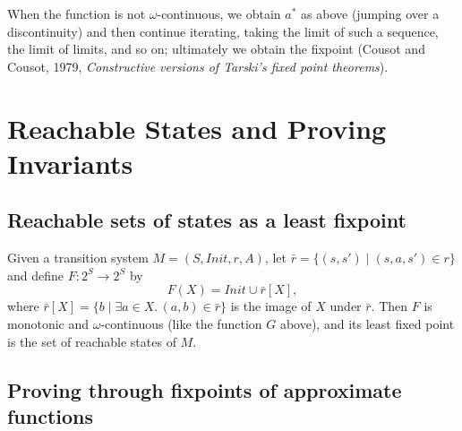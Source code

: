 When the function is not $\omega$-continuous, we obtain $a^*$ as above (jumping over a discontinuity) and then continue iterating, taking the limit of such a sequence, the limit of limits, and so on; ultimately we obtain the fixpoint (Cousot and Cousot, 1979, \emph{Constructive versions of Tarski's fixed point theorems}).
 
 
 
\section{Reachable States and Proving Invariants}
 
\subsection*{Reachable sets of states as a least fixpoint}
 
Given a transition system $M = (S, \mathit{Init}, r, A)$, let $\bar r = \{(s, s') \mid (s, a, s') \in r\}$ and define $F : 2^S \to 2^S$ by
\[
F(X) = \mathit{Init} \cup \bar r[X],
\]
where $\bar r[X] = \{b \mid \exists a \in X.\, (a, b) \in \bar r\}$ is the image of $X$ under $\bar r$. Then $F$ is monotonic and $\omega$-continuous (like the function $G$ above), and its least fixed point is the set of reachable states of $M$.
 
\subsection*{Proving through fixpoints of approximate functions}
 
